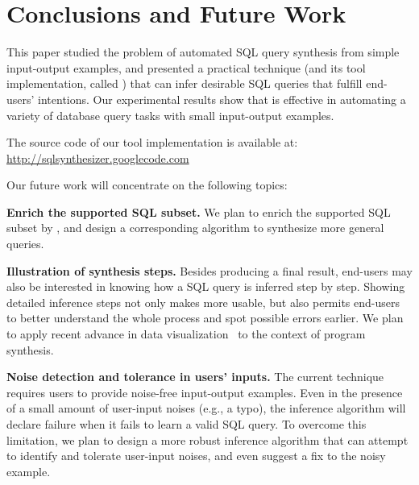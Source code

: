 \section{Conclusions and Future Work}
\label{sec:conclusion}




This paper studied the problem of automated SQL query synthesis
from simple input-output examples, and presented a
practical technique (and its tool implementation, called \ourtool)
that can infer desirable SQL queries that fulfill end-users' intentions.
Our experimental results show that \ourtool is
effective in automating a variety of database query tasks
with small input-output examples.

The source code of our tool implementation is available at: \\
\url{http://sqlsynthesizer.googlecode.com}

\vspace{1mm}

Our future work will concentrate on the following topics:

\textbf{Enrich the supported SQL subset.} We plan to enrich the
supported SQL subset by \ourtool, and design a corresponding algorithm
to synthesize more general queries.

\textbf{Illustration of synthesis steps.} Besides
producing a final result, end-users may also be interested in knowing
how a SQL query is inferred step by step.
Showing detailed inference steps not
only makes \ourtool more usable, but also permits
end-users to better understand the whole process and
spot possible errors earlier.
We plan to apply recent advance in data visualization~\cite{Kandel:2011}
to the context of program synthesis.

\textbf{Noise detection and tolerance in users' inputs.} The current technique
requires users to provide noise-free input-output examples.
Even in the presence of a small amount of user-input noises (e.g., a typo),
the inference algorithm will declare failure when it fails to learn
a valid SQL query.
To overcome this limitation, we plan to design a more robust inference
algorithm that can attempt to identify and tolerate user-input noises,
and even suggest a fix to the noisy example.




